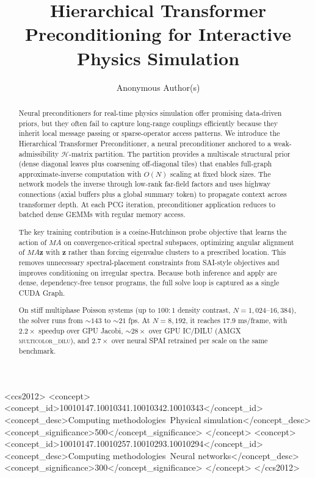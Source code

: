 \documentclass[acmtog,anonymous,review]{acmart}
\theoremstyle{plain}
\begin{document}
\title{Hierarchical Transformer Preconditioning for Interactive Physics Simulation}

\author{Anonymous Author(s)}

\renewcommand{\shortauthors}{Anonymous Author(s)}

\begin{abstract}
Neural preconditioners for real-time physics simulation offer promising data-driven priors, but
they often fail to capture long-range couplings efficiently because they inherit local message
passing or sparse-operator access patterns. We introduce the Hierarchical Transformer
Preconditioner, a neural preconditioner anchored to a weak-admissibility $\mathcal{H}$-matrix
partition. The partition provides a multiscale structural prior (dense diagonal leaves plus
coarsening off-diagonal tiles) that enables full-graph approximate-inverse computation with
$O(N)$ scaling at fixed block sizes. The network models the inverse through low-rank far-field
factors and uses highway connections (axial buffers plus a global summary token) to propagate
context across transformer depth. At each PCG iteration, preconditioner application reduces to
batched dense GEMMs with regular memory access.

The key training contribution is a cosine-Hutchinson probe objective that learns the action of
$MA$ on convergence-critical spectral subspaces, optimizing angular alignment of $MA\mathbf{z}$
with $\mathbf{z}$ rather than forcing eigenvalue clusters to a prescribed location. This removes
unnecessary spectral-placement constraints from SAI-style objectives and improves conditioning on
irregular spectra. Because both inference and apply are dense, dependency-free tensor programs,
the full solve loop is captured as a single CUDA Graph.

On stiff multiphase Poisson systems (up to $100\!:\!1$ density contrast,
$N\!=\!1{,}024$--$16{,}384$), the solver runs from $\sim\!143$ to $\sim\!21$ fps. At
$N\!=\!8{,}192$, it reaches $17.9$ ms/frame, with $2.2\times$ speedup over GPU Jacobi,
$\sim\!28\times$ over GPU IC/DILU (AMGX \textsc{multicolor\_dilu}), and $2.7\times$ over
neural SPAI retrained per scale on the same benchmark.
\end{abstract}

\begin{CCSXML}
<ccs2012>
 <concept>
  <concept_id>10010147.10010341.10010342.10010343</concept_id>
  <concept_desc>Computing methodologies~Physical simulation</concept_desc>
  <concept_significance>500</concept_significance>
 </concept>
 <concept>
  <concept_id>10010147.10010257.10010293.10010294</concept_id>
  <concept_desc>Computing methodologies~Neural networks</concept_desc>
  <concept_significance>300</concept_significance>
 </concept>
</ccs2012>
\end{CCSXML}
\end{document}

